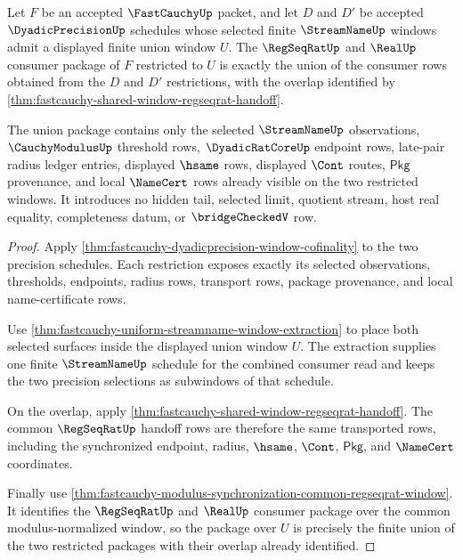 \begin{theorem}
\label{thm:fastcauchy-tail-window-union-lock}
Let $F$ be an accepted $\FastCauchyUp$ packet, and let $D$ and $D'$ be accepted
$\DyadicPrecisionUp$ schedules whose selected finite $\StreamNameUp$ windows
admit a displayed finite union window $U$. The $\RegSeqRatUp$ and $\RealUp$
consumer package of $F$ restricted to $U$ is exactly the union of the consumer
rows obtained from the $D$ and $D'$ restrictions, with the overlap identified by
\autoref{thm:fastcauchy-shared-window-regseqrat-handoff}.

The union package contains only the selected $\StreamNameUp$ observations,
$\CauchyModulusUp$ threshold rows, $\DyadicRatCoreUp$ endpoint rows, late-pair
radius ledger entries, displayed $\hsame$ rows, displayed $\Cont$ routes,
$\mathsf{Pkg}$ provenance, and local $\NameCert$ rows already visible on the two
restricted windows. It introduces no hidden tail, selected limit, quotient
stream, host real equality, completeness datum, or $\bridgeCheckedV$ row.
\end{theorem}
\begin{proof}
Apply \autoref{thm:fastcauchy-dyadicprecision-window-cofinality} to the two
precision schedules. Each restriction exposes exactly its selected observations,
thresholds, endpoints, radius rows, transport rows, package provenance, and local
name-certificate rows.

Use \autoref{thm:fastcauchy-uniform-streamname-window-extraction} to place both
selected surfaces inside the displayed union window $U$. The extraction supplies
one finite $\StreamNameUp$ schedule for the combined consumer read and keeps the
two precision selections as subwindows of that schedule.

On the overlap, apply
\autoref{thm:fastcauchy-shared-window-regseqrat-handoff}. The common
$\RegSeqRatUp$ handoff rows are therefore the same transported rows, including
the synchronized endpoint, radius, $\hsame$, $\Cont$, $\mathsf{Pkg}$, and
$\NameCert$ coordinates.

Finally use
\autoref{thm:fastcauchy-modulus-synchronization-common-regseqrat-window}. It
identifies the $\RegSeqRatUp$ and $\RealUp$ consumer package over the common
modulus-normalized window, so the package over $U$ is precisely the finite union
of the two restricted packages with their overlap already identified.
\end{proof}

